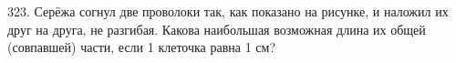 323. Серёжа согнул две проволоки так, как показано на рисунке, и наложил их друг на друга, не разгибая. Какова наибольшая возможная длина их общей (совпавшей) части, если 1 клеточка равна 1 см?\\
\begin{figure}[ht!]
\end{figure}\\
